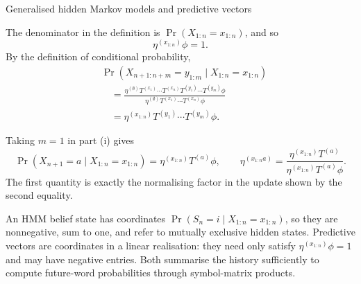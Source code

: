 \begin{exercise}[Extension]{Generalised hidden Markov models and predictive vectors}
\begin{solution}
\begin{parts}
      \item
        \begin{subparts}
          \item The denominator in the definition is
            $\Pr(X_{1:n}=x_{1:n})$, and so
            \[
              \eta^{(x_{1:n})}\phi=1.
            \]
            By the definition of conditional probability,
            \[
              \begin{aligned}
                &\Pr(X_{n+1:n+m}=y_{1:m}\mid X_{1:n}=x_{1:n})\\
                &\quad=
                  \frac{\eta^{(\emptyset)}
                    T^{(x_1)}\cdots T^{(x_n)}
                    T^{(y_1)}\cdots T^{(y_m)}\phi}
                  {\eta^{(\emptyset)}
                    T^{(x_1)}\cdots T^{(x_n)}\phi}\\
                &\quad=
                  \eta^{(x_{1:n})}
                    T^{(y_1)}\cdots T^{(y_m)}\phi.
              \end{aligned}
            \]

          \item Taking $m=1$ in part (i) gives
            \[
              \Pr(X_{n+1}=a\mid X_{1:n}=x_{1:n})
                =\eta^{(x_{1:n})}T^{(a)}\phi,
              \qquad
              \eta^{(x_{1:n}a)}
                =\frac{\eta^{(x_{1:n})}T^{(a)}}
                  {\eta^{(x_{1:n})}T^{(a)}\phi}.
            \]
            The first quantity is exactly the normalising factor in the
            update shown by the second equality.

          \item An HMM belief state has coordinates
            $\Pr(S_n=i\mid X_{1:n}=x_{1:n})$, so they are nonnegative, sum to
            one, and refer to mutually exclusive hidden states. Predictive
            vectors are coordinates in a linear realisation: they need only
            satisfy $\eta^{(x_{1:n})}\phi=1$ and may have negative entries.
            Both summarise the history sufficiently to compute future-word
            probabilities through symbol-matrix products.
        \end{subparts}


\end{parts}
\end{solution}
\end{exercise}

